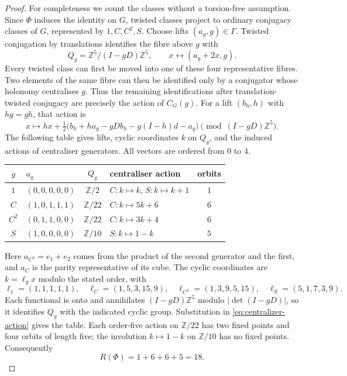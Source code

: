 \documentclass[11pt]{amsart}
\theoremstyle{definition}
\newcommand{\Z}{\mathbb{Z}}
\begin{document}
\begin{proof}
For completeness we count the classes without a torsion-free assumption. Since $\Phi$ induces the identity
on $G$, twisted classes project to ordinary conjugacy classes of $G$, represented by $1,C,C^2,S$.
Choose lifts $(a_g,g)\in\Gamma$. Twisted conjugation by translations identifies the fibre above $g$ with
\[
 Q_g=\Z^5/(I-gD)\Z^5,
 \qquad x\longleftrightarrow(a_g+2x,g).
\]
Every twisted class can first be moved into one of these four representative fibres.
Two elements of the same fibre can then be identified only by a conjugator whose holonomy centralises $g$.
Thus the remaining identifications after translation-twisted conjugacy are precisely the action of $C_G(g)$.
For a lift $(b_h,h)$ with $hg=gh$, that action is
\begin{equation}\label{eq:centralizer-action}
 x\longmapsto h x+\tfrac12\bigl(b_h+h a_g-gDb_h-g(I-h)d-a_g\bigr)
 \pmod{(I-gD)\Z^5}.
\end{equation}
The following table gives lifts, cyclic coordinates $k$ on $Q_g$, and the induced actions of centraliser
generators. All vectors are ordered from $0$ to $4$.
\begin{center}\small
\begin{tabular}{clclc}
\toprule
$g$ & $a_g$ & $Q_g$ & centraliser action & orbits\\
\midrule
$1$ & $(0,0,0,0,0)$ & $\Z/2$ & $C:k\mapsto k$, $S:k\mapsto k+1$ & $1$\\
$C$ & $(1,0,1,1,1)$ & $\Z/22$ & $C:k\mapsto5k+6$ & $6$\\
$C^2$ & $(0,1,1,0,0)$ & $\Z/22$ & $C:k\mapsto3k+4$ & $6$\\
$S$ & $(1,0,0,0,0)$ & $\Z/10$ & $S:k\mapsto1-k$ & $5$\\
\bottomrule
\end{tabular}
\end{center}
Here $a_{C^2}=e_1+e_2$ comes from the product of the second generator and the first, and $a_C$ is the parity
representative of its cube. The cyclic coordinates are $k=\ell_g x$ modulo the stated order, with
\[
 \ell_1=(1,1,1,1,1),\quad \ell_C=(1,5,3,15,9),\quad
 \ell_{C^2}=(1,3,9,5,15),\quad \ell_S=(5,1,7,3,9).
\]
Each functional is onto and annihilates $(I-gD)\Z^5$ modulo $|\det(I-gD)|$, so it identifies $Q_g$ with the
indicated cyclic group. Substitution in \eqref{eq:centralizer-action} gives the table.
Each order-five action on $\Z/22$ has two fixed points and four orbits of length five; the involution
$k\mapsto1-k$ on $\Z/10$ has no fixed points. Consequently
\[
 R(\Phi)=1+6+6+5=18.
\]
\end{proof}
\end{document}
